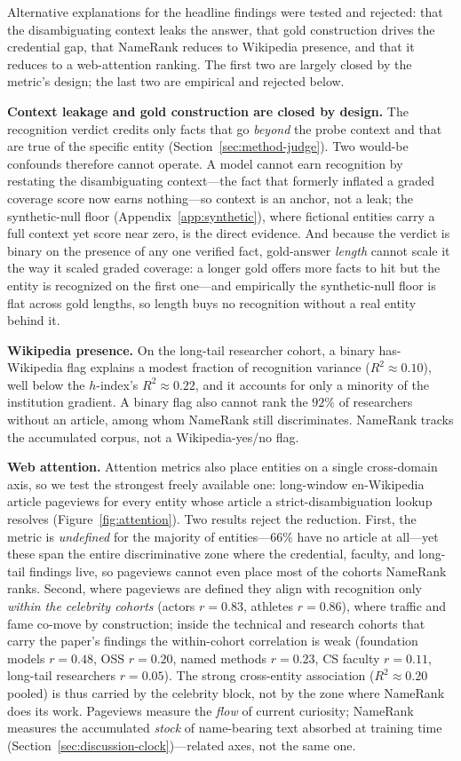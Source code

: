 Alternative explanations for the headline findings were tested and rejected: that the disambiguating context leaks the answer, that gold construction drives the credential gap, that NameRank reduces to Wikipedia presence, and that it reduces to a web-attention ranking. The first two are largely closed by the metric's design; the last two are empirical and rejected below.

\textbf{Context leakage and gold construction are closed by design.} The recognition verdict credits only facts that go \emph{beyond} the probe context and that are true of the specific entity (Section~\ref{sec:method-judge}). Two would-be confounds therefore cannot operate. A model cannot earn recognition by restating the disambiguating context---the fact that formerly inflated a graded coverage score now earns nothing---so context is an anchor, not a leak; the synthetic-null floor (Appendix~\ref{app:synthetic}), where fictional entities carry a full context yet score near zero, is the direct evidence. And because the verdict is binary on the presence of any one verified fact, gold-answer \emph{length} cannot scale it the way it scaled graded coverage: a longer gold offers more facts to hit but the entity is recognized on the first one---and empirically the synthetic-null floor is flat across gold lengths, so length buys no recognition without a real entity behind it.

\textbf{Wikipedia presence.} On the long-tail researcher cohort, a binary has-Wikipedia flag explains a modest fraction of recognition variance ($R^2 \approx 0.10$), well below the $h$-index's $R^2 \approx 0.22$, and it accounts for only a minority of the institution gradient. A binary flag also cannot rank the $92\%$ of researchers without an article, among whom NameRank still discriminates. NameRank tracks the accumulated corpus, not a Wikipedia-yes/no flag.

\textbf{Web attention.} Attention metrics also place entities on a single cross-domain axis, so we test the strongest freely available one: long-window en-Wikipedia article pageviews for every entity whose article a strict-disambiguation lookup resolves (Figure~\ref{fig:attention}). Two results reject the reduction. First, the metric is \emph{undefined} for the majority of entities---$66\%$ have no article at all---yet these span the entire discriminative zone where the credential, faculty, and long-tail findings live, so pageviews cannot even place most of the cohorts NameRank ranks. Second, where pageviews are defined they align with recognition only \emph{within the celebrity cohorts} (actors $r=0.83$, athletes $r=0.86$), where traffic and fame co-move by construction; inside the technical and research cohorts that carry the paper's findings the within-cohort correlation is weak (foundation models $r=0.48$, OSS $r=0.20$, named methods $r=0.23$, CS faculty $r=0.11$, long-tail researchers $r=0.05$). The strong cross-entity association ($R^2 \approx 0.20$ pooled) is thus carried by the celebrity block, not by the zone where NameRank does its work. Pageviews measure the \emph{flow} of current curiosity; NameRank measures the accumulated \emph{stock} of name-bearing text absorbed at training time (Section~\ref{sec:discussion-clock})---related axes, not the same one.

